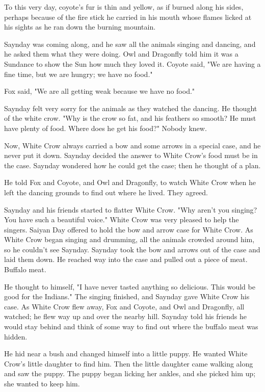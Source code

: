 To this very day, coyote's fur is thin and yellow, as if burned along his sides, perhaps because of the fire stick he carried in his mouth whose flames licked at his sights as he ran down the burning mountain.

Saynday was coming along, and he saw all the animals singing and dancing, and he asked them what they were doing. Owl and Dragonfly told him it was a Sundance to show the Sun how much they loved it. Coyote said, "We are having a fine time, but we are hungry; we have no food."

Fox said, "We are all getting weak because we have no food."

Saynday felt very sorry for the animals as they watched the dancing. He thought of the white crow. "Why is the crow so fat, and his feathers so smooth? He must have plenty of food. Where does he get his food?" Nobody knew.

Now, White Crow always carried a bow and some arrows in a special case, and he never put it down. Saynday decided the answer to White Crow's food must be in the case. Saynday wondered how he could get the case; then he thought of a plan.

He told Fox and Coyote, and Owl and Dragonfly, to watch White Crow when he left the dancing grounds to find out where he lived. They agreed.

Saynday and his friends started to flatter White Crow. "Why aren't you singing? You have such a beautiful voice." White Crow was very pleased to help the singers. Saiyan Day offered to hold the bow and arrow case for White Crow. As White Crow began singing and drumming, all the animals crowded around him, so he couldn't see Saynday. Saynday took the bow and arrows out of the case and laid them down. He reached way into the case and pulled out a piece of meat. Buffalo meat.

He thought to himself, "I have never tasted anything so delicious. This would be good for the Indians." The singing finished, and Saynday gave White Crow his case. As White Crow flew away, Fox and Coyote, and Owl and Dragonfly, all watched; he flew way up and over the nearby hill. Saynday told his friends he would stay behind and think of some way to find out where the buffalo meat was hidden.

He hid near a bush and changed himself into a little puppy. He wanted White Crow's little daughter to find him. Then the little daughter came walking along and saw the puppy. The puppy began licking her ankles, and she picked him up; she wanted to keep him.

